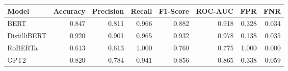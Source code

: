 \begin{tabular}{|l||r|r|r|r|r|r|r|}
\toprule
Model & \textbf{Accuracy} & \textbf{Precision} & Recall & \textbf{F1-Score} & \textbf{ROC-AUC} & \textbf{FPR} & FNR \\
\midrule \midrule
BERT & 0.847 & 0.811 & 0.966 & 0.882 & 0.918 & 0.328 & 0.034 \\
DistilliBERT & 0.920 & 0.901 & 0.965 & 0.932 & 0.978 & 0.138 & 0.035 \\
RoBERTa & 0.613 & 0.613 & 1.000 & 0.760 & 0.775 & 1.000 & 0.000 \\
GPT2 & 0.820 & 0.784 & 0.941 & 0.856 & 0.865 & 0.338 & 0.059 \\
\bottomrule
\end{tabular}
